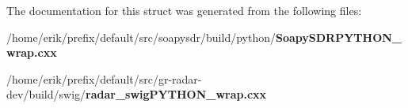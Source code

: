 The documentation for this struct was generated from the following files\+:\begin{DoxyCompactItemize}
\item 
/home/erik/prefix/default/src/soapysdr/build/python/{\bf Soapy\+S\+D\+R\+P\+Y\+T\+H\+O\+N\+\_\+wrap.\+cxx}\item 
/home/erik/prefix/default/src/gr-\/radar-\/dev/build/swig/{\bf radar\+\_\+swig\+P\+Y\+T\+H\+O\+N\+\_\+wrap.\+cxx}\end{DoxyCompactItemize}
